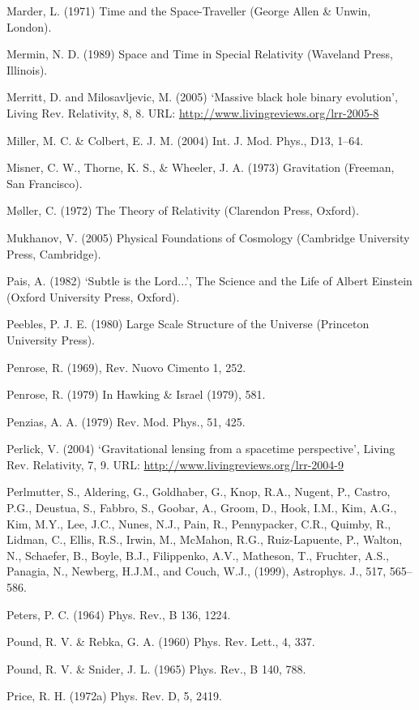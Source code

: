 {Marder, L. (1971) Time and the Space-Traveller (George Allen \& Unwin, London).


Mermin, N. D. (1989) Space and Time in Special Relativity (Waveland Press, Illinois).


Merritt, D. and Milosavljevic, M. (2005) ‘Massive black hole binary evolution’, Living Rev. Relativity, 8, 8. URL: \url{http://www.livingreviews.org/lrr-2005-8}


Miller, M. C. \& Colbert, E. J. M. (2004) Int. J. Mod. Phys., D13, 1–64.


Misner, C. W., Thorne, K. S., \& Wheeler, J. A. (1973) Gravitation (Freeman, San Francisco).


Møller, C. (1972) The Theory of Relativity (Clarendon Press, Oxford).


Mukhanov, V. (2005) Physical Foundations of Cosmology (Cambridge University Press, Cambridge).


Pais, A. (1982) ‘Subtle is the Lord...’, The Science and the Life of Albert Einstein (Oxford University Press, Oxford).


Peebles, P. J. E. (1980) Large Scale Structure of the Universe (Princeton University Press).


Penrose, R. (1969), Rev. Nuovo Cimento 1, 252.


Penrose, R. (1979) In Hawking \& Israel (1979), 581.


Penzias, A. A. (1979) Rev. Mod. Phys., 51, 425.


Perlick, V. (2004) ‘Gravitational lensing from a spacetime perspective’, Living Rev. Relativity, 7, 9. URL: \url{http://www.livingreviews.org/lrr-2004-9}


Perlmutter, S., Aldering, G., Goldhaber, G., Knop, R.A., Nugent, P., Castro, P.G., Deustua, S., Fabbro, S., Goobar, A., Groom, D., Hook, I.M., Kim, A.G., Kim, M.Y., Lee, J.C.,
Nunes, N.J., Pain, R., Pennypacker, C.R., Quimby, R., Lidman, C., Ellis, R.S., Irwin, M., McMahon, R.G., Ruiz-Lapuente, P., Walton, N., Schaefer, B., Boyle, B.J., Filippenko, A.V., Matheson, T., Fruchter, A.S., Panagia, N., Newberg, H.J.M., and Couch, W.J., (1999), Astrophys. J., 517, 565–586. 

Peters, P. C. (1964) Phys. Rev., B 136, 1224.


Pound, R. V. \& Rebka, G. A. (1960) Phys. Rev. Lett., 4, 337.


Pound, R. V. \& Snider, J. L. (1965) Phys. Rev., B 140, 788.


Price, R. H. (1972a) Phys. Rev. D, 5, 2419.


}
